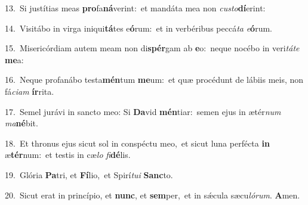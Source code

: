 {\numbfont\textcolor{\numbcolor}{13.}}~Si justítias meas \textbf{pro}\-fa\-\textbf{ná}\-verint:~\star et mandáta mea non \textit{cus}\-\textit{to}\textbf{dí}erint:\par
{\numbfont\textcolor{\numbcolor}{14.}}~Visitábo in virga iniqui\-\textbf{tá}\-tes e\-\textbf{ó}\-rum:~\star et in verbéribus peccá\textit{ta} \textit{e}\-\textbf{ó}rum.\par
{\numbfont\textcolor{\numbcolor}{15.}}~Misericórdiam autem meam non di\-\textbf{spér}\-gam ab \textbf{e}\-o:~\star neque nocébo in veri\-\textit{tá}\-\textit{te} \textbf{me}\-a:\par
{\numbfont\textcolor{\numbcolor}{16.}}~Neque profanábo testa\-\textbf{mén}\-tum \textbf{me}\-um:~\star et quæ procédunt de lábiis meis, non fá\-\textit{ci}\-\textit{am} \textbf{ír}\-rita.\par
{\numbfont\textcolor{\numbcolor}{17.}}~Semel jurávi in sancto meo: Si \textbf{Da}\-vid \textbf{mén}\-tiar:~\star semen ejus in ætér\textit{num} \textit{ma}\-\textbf{né}bit.\par
{\numbfont\textcolor{\numbcolor}{18.}}~Et thronus ejus sicut sol in conspéctu meo,~\dagger et sicut luna perfécta \textbf{in} æ\-\textbf{tér}\-num:~\star et testis in cæ\textit{lo} \textit{fi}\-\textbf{dé}lis.\par
{\numbfont\textcolor{\numbcolor}{19.}}~Glória \textbf{Pa}\-tri, et \textbf{Fí}\-lio,~\star et Spirí\-\textit{tu}\-\textit{i} \textbf{Sanc}\-to.\par
{\numbfont\textcolor{\numbcolor}{20.}}~Sicut erat in princípio, et \textbf{nunc}\-, et \textbf{sem}\-per,~\star et in sǽcula sæcu\-\textit{ló}\-\textit{rum}. \textbf{A}\-men.\par
